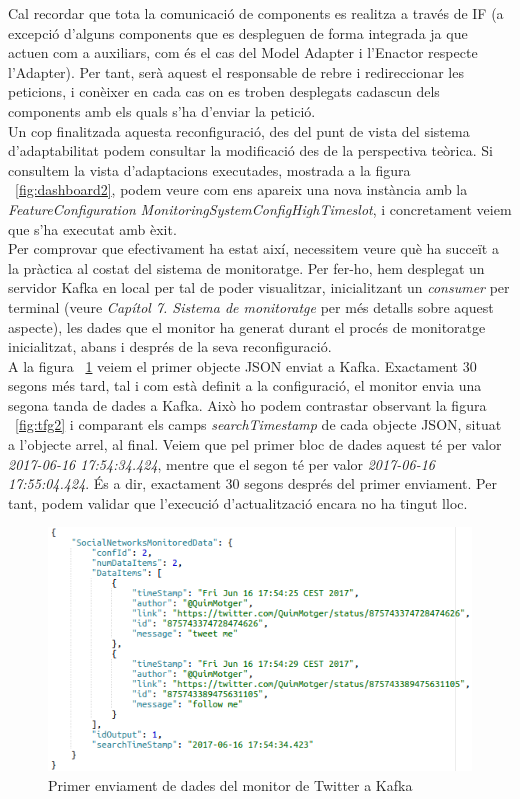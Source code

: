 Cal recordar que tota la comunicació de components es realitza a través de IF (a excepció d'alguns components que es despleguen de forma integrada ja que actuen com a auxiliars, com és el cas del Model Adapter i l'Enactor respecte l'Adapter). Per tant, serà aquest el responsable de rebre i redireccionar les peticions, i conèixer en cada cas on es troben desplegats cadascun dels components amb els quals s'ha d'enviar la petició.\\

Un cop finalitzada aquesta reconfiguració, des del punt de vista del sistema d'adaptabilitat podem consultar la modificació des de la perspectiva teòrica. Si consultem la vista d'adaptacions executades, mostrada a la figura ~\ref{fig:dashboard2}, podem veure com ens apareix una nova instància amb la \textit{FeatureConfiguration} \textit{MonitoringSystemConfigHighTimeslot}, i concretament veiem que s'ha executat amb èxit.\\

Per comprovar que efectivament ha estat així, necessitem veure què ha succeït a la pràctica al costat del sistema de monitoratge. Per fer-ho, hem desplegat un servidor Kafka en local per tal de poder visualitzar, inicialitzant un \textit{consumer} per terminal (veure \textit{Capítol 7. Sistema de monitoratge} per més detalls sobre aquest aspecte), les dades que el monitor ha generat durant el procés de monitoratge inicialitzat, abans i després de la seva reconfiguració.\\

A la figura ~\ref{fig:tfg1} veiem el primer objecte JSON enviat a Kafka. Exactament 30 segons més tard, tal i com està definit a la configuració, el monitor envia una segona tanda de dades a Kafka. Això ho podem contrastar observant la figura ~\ref{fig:tfg2} i comparant els camps \textit{searchTimestamp} de cada objecte JSON, situat a l'objecte arrel, al final. Veiem que pel primer bloc de dades aquest té per valor \textit{2017-06-16 17:54:34.424}, mentre que el segon té per valor \textit{2017-06-16 17:55:04.424}. És a dir, exactament 30 segons després del primer enviament. Per tant, podem validar que l'execució d'actualització encara no ha tingut lloc.\\

\begin{figure}[H]
\centering
\includegraphics[width=14cm]{Figures/tfg1}
\decoRule
\caption{Primer enviament de dades del monitor de Twitter a Kafka}
\label{fig:tfg1}
\end{figure} 

